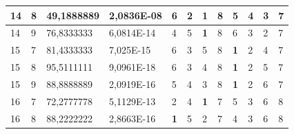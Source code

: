 \documentclass[conference]{IEEEtran}
\begin{document}
\begin{table}[]
\begin{tabular}{|llll|llllllll|}
		\multicolumn{1}{|l|}{14}  & \multicolumn{1}{l|}{8}         & \multicolumn{1}{l|}{49,1888889}    & 2,0836E-08 & \multicolumn{1}{l|}{6}          & \multicolumn{1}{l|}{2}          & \multicolumn{1}{l|}{\textbf{1}} & \multicolumn{1}{l|}{8}   & \multicolumn{1}{l|}{5}          & \multicolumn{1}{l|}{4}          & \multicolumn{1}{l|}{3}   & 7                      \\ \hline
		\multicolumn{1}{|l|}{14}  & \multicolumn{1}{l|}{9}         & \multicolumn{1}{l|}{76,8333333}    & 6,0814E-14 & \multicolumn{1}{l|}{4}          & \multicolumn{1}{l|}{5}          & \multicolumn{1}{l|}{\textbf{1}} & \multicolumn{1}{l|}{8}   & \multicolumn{1}{l|}{6}          & \multicolumn{1}{l|}{3}          & \multicolumn{1}{l|}{2}   & 7                      \\ \hline
		\multicolumn{1}{|l|}{15}  & \multicolumn{1}{l|}{7}         & \multicolumn{1}{l|}{81,4333333}    & 7,025E-15  & \multicolumn{1}{l|}{6}          & \multicolumn{1}{l|}{3}          & \multicolumn{1}{l|}{5}          & \multicolumn{1}{l|}{8}   & \multicolumn{1}{l|}{\textbf{1}} & \multicolumn{1}{l|}{2}          & \multicolumn{1}{l|}{4}   & 7                      \\ \hline
		\multicolumn{1}{|l|}{15}  & \multicolumn{1}{l|}{8}         & \multicolumn{1}{l|}{95,5111111}    & 9,0961E-18 & \multicolumn{1}{l|}{6}          & \multicolumn{1}{l|}{3}          & \multicolumn{1}{l|}{4}          & \multicolumn{1}{l|}{8}   & \multicolumn{1}{l|}{\textbf{1}} & \multicolumn{1}{l|}{2}          & \multicolumn{1}{l|}{5}   & 7                      \\ \hline
		\multicolumn{1}{|l|}{15}  & \multicolumn{1}{l|}{9}         & \multicolumn{1}{l|}{88,8888889}    & 2,0919E-16 & \multicolumn{1}{l|}{5}          & \multicolumn{1}{l|}{4}          & \multicolumn{1}{l|}{3}          & \multicolumn{1}{l|}{8}   & \multicolumn{1}{l|}{\textbf{1}} & \multicolumn{1}{l|}{2}          & \multicolumn{1}{l|}{6}   & 7                      \\ \hline
		\multicolumn{1}{|l|}{16}  & \multicolumn{1}{l|}{7}         & \multicolumn{1}{l|}{72,2777778}    & 5,1129E-13 & \multicolumn{1}{l|}{2}          & \multicolumn{1}{l|}{4}          & \multicolumn{1}{l|}{\textbf{1}} & \multicolumn{1}{l|}{7}   & \multicolumn{1}{l|}{5}          & \multicolumn{1}{l|}{3}          & \multicolumn{1}{l|}{6}   & 8                      \\ \hline
		\multicolumn{1}{|l|}{16}  & \multicolumn{1}{l|}{8}         & \multicolumn{1}{l|}{88,2222222}    & 2,8663E-16 & \multicolumn{1}{l|}{\textbf{1}} & \multicolumn{1}{l|}{5}          & \multicolumn{1}{l|}{2}          & \multicolumn{1}{l|}{7}   & \multicolumn{1}{l|}{4}          & \multicolumn{1}{l|}{3}          & \multicolumn{1}{l|}{6}   & 8                      \\ \hline

\end{tabular}
\end{table}
\end{document}
